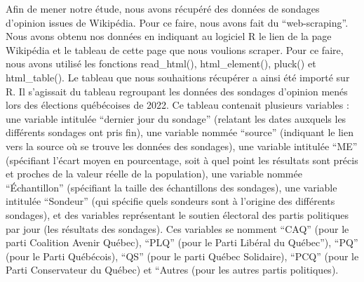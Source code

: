 \documentclass[
  letterpaper,
  DIV=11,
  numbers=noendperiod]{scrartcl}
\begin{document}
Afin de mener notre étude, nous avons récupéré des données de sondages
d'opinion issues de Wikipédia. Pour ce faire, nous avons fait du
``web-scraping''. Nous avons obtenu nos données en indiquant au logiciel
R le lien de la page Wikipédia et le tableau de cette page que nous
voulions scraper. Pour ce faire, nous avons utilisé les fonctions
read\_html(), html\_element(), pluck() et html\_table(). Le tableau que
nous souhaitions récupérer a ainsi été importé sur R. Il s'agissait du
tableau regroupant les données des sondages d'opinion menés lors des
élections québécoises de 2022. Ce tableau contenait plusieurs variables
: une variable intitulée ``dernier jour du sondage'' (relatant les dates
auxquels les différents sondages ont pris fin), une variable nommée
``source'' (indiquant le lien vers la source où se trouve les données
des sondages), une variable intitulée ``ME'' (spécifiant l'écart moyen
en pourcentage, soit à quel point les résultats sont précis et proches
de la valeur réelle de la population), une variable nommée
``Échantillon'' (spécifiant la taille des échantillons des sondages),
une variable intitulée ``Sondeur'' (qui spécifie quels sondeurs sont à
l'origine des différents sondages), et des variables représentant le
soutien électoral des partis politiques par jour (les résultats des
sondages). Ces variables se nomment ``CAQ'' (pour le parti Coalition
Avenir Québec), ``PLQ'' (pour le Parti Libéral du Québec''), ``PQ''
(pour le Parti Québécois), ``QS'' (pour le parti Québec Solidaire),
``PCQ'' (pour le Parti Conservateur du Québec) et ``Autres (pour les
autres partis politiques).
\end{document}
